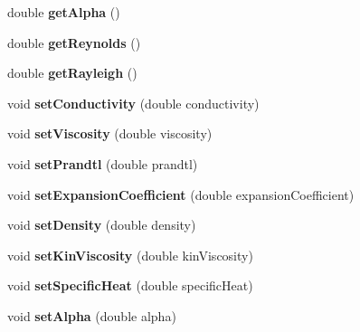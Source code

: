 \begin{DoxyCompactItemize}
\mbox{\label{class_air_properties_ae6b00fbabd5fca301a600c007eaf63e5}} 
double {\bfseries get\+Alpha} ()
\item 
\mbox{\label{class_air_properties_a65c391506fe0e8928bd9735936fc431b}} 
double {\bfseries get\+Reynolds} ()
\item 
\mbox{\label{class_air_properties_a93f0be70b3e396ae2f7f2dfd47d13c13}} 
double {\bfseries get\+Rayleigh} ()
\item 
\mbox{\label{class_air_properties_a3bfb9925671f251f5983f919d663b065}} 
void {\bfseries set\+Conductivity} (double conductivity)
\item 
\mbox{\label{class_air_properties_acbf2ba9c4555699e82e76f6f250a7613}} 
void {\bfseries set\+Viscosity} (double viscosity)
\item 
\mbox{\label{class_air_properties_aa01afbbf8dc220b2db641623417fcaa6}} 
void {\bfseries set\+Prandtl} (double prandtl)
\item 
\mbox{\label{class_air_properties_acd587b762844b90db835b8796b45ca50}} 
void {\bfseries set\+Expansion\+Coefficient} (double expansion\+Coefficient)
\item 
\mbox{\label{class_air_properties_af3c351767343b2e15e6b82940865ad07}} 
void {\bfseries set\+Density} (double density)
\item 
\mbox{\label{class_air_properties_aed8aee8df557e3cdac8eb7903e116e15}} 
void {\bfseries set\+Kin\+Viscosity} (double kin\+Viscosity)
\item 
\mbox{\label{class_air_properties_a42a4fd4914ca8ca93d20da4a2e51a806}} 
void {\bfseries set\+Specific\+Heat} (double specific\+Heat)
\item 
\mbox{\label{class_air_properties_a5313343ff1ee238e086ad42bab836449}} 
void {\bfseries set\+Alpha} (double alpha)
\item 
\mbox{\label{class_air_properties_aed80404187136ab3c6b0afff9695314c}} 

\end{DoxyCompactItemize}
